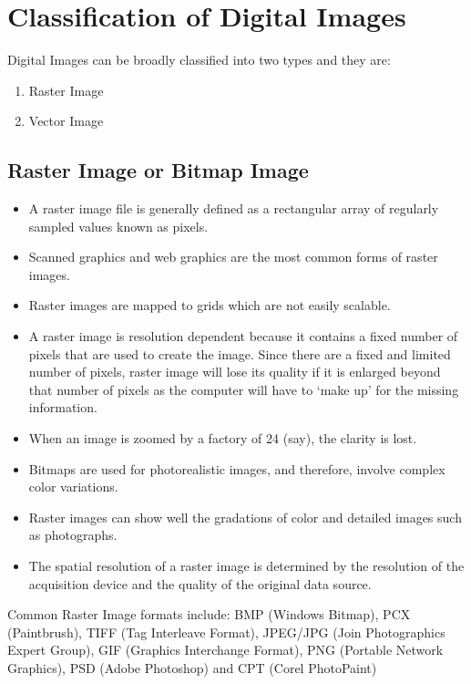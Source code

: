 \section{Classification of Digital Images}

Digital Images can be broadly classified into two types and they are:
\begin{enumerate}
    \item Raster Image
    \item Vector Image
\end{enumerate}

\subsection{Raster Image or Bitmap Image}

\begin{itemize}
    \item A raster image file is generally defined as a rectangular array of regularly sampled values known as pixels.
    \item Scanned graphics and web graphics are the most common forms of raster images.
    \item Raster images are mapped to grids which are not easily scalable.
    \item A raster image is resolution dependent because it contains a fixed number of pixels that are used to create the image. Since there are a fixed and limited number of pixels, raster image will lose its quality if it is enlarged beyond that number of pixels as the computer will have to `make up' for the missing information.
    \item When an image is zoomed by a factory of 24 (say), the clarity is lost.
    \item Bitmaps are used for photorealistic images, and therefore, involve complex color variations.
    \item Raster images can show well the gradations of color and detailed images such as photographs.
    \item The spatial resolution of a raster image is determined by the resolution of the acquisition device and the quality of the original data source.
\end{itemize}

Common Raster Image formats include:
BMP (Windows Bitmap), PCX (Paintbrush), TIFF (Tag Interleave Format), JPEG/JPG (Join Photographics Expert Group), GIF (Graphics Interchange Format), PNG (Portable Network Graphics), PSD (Adobe Photoshop) and CPT (Corel PhotoPaint)

